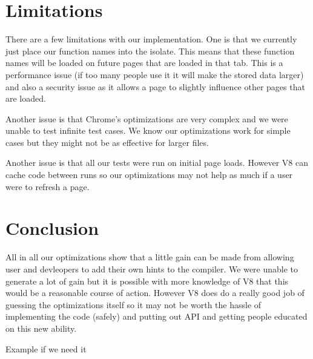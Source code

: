 \documentclass[twocolumn,showpacs,%
  nofootinbib,aps,superscriptaddress,%
  eqsecnum,prd,notitlepage,showkeys,10pt]{revtex4-1}
\begin{document}
\section{Limitations}
There are a few limitations with our implementation. One is that we currently just place our function names into the isolate. This means that these function names will be loaded on future pages that are loaded in that tab. This is a performance issue (if too many people use it it will make the stored data larger) and also a security issue as it allows a page to slightly influence other pages that are loaded.

Another issue is that Chrome's optimizations are very complex and we were unable to test infinite test cases. We know our optimizations work for simple cases but they might not be as effective for larger files. 

Another issue is that all our tests were run on initial page loads. However V8 can cache code between runs so our optimizations may not help as much if a user were to refresh a page.


\section{Conclusion}
All in all our optimizations show that a little gain can be made from allowing user and devleopers to add their own hints to the compiler. We were unable to generate a lot of gain but it is possible with more knowledge of V8 that this would be a reasonable course of action. However V8 does do a really good job of guessing the optimizations itself so it may not be worth the hassle of implementing the code (safely) and putting out API and getting people educated on this new ability. 





\begin{thebibliography}{9}

 Example if we need it





\end{thebibliography}
\end{document}
